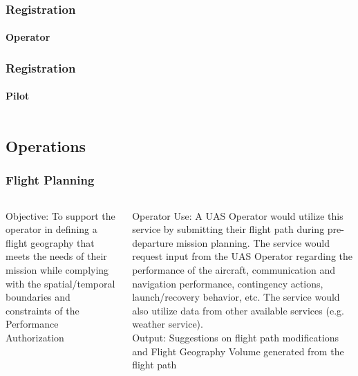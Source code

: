 \documentclass[usenames,dvipsnames,aspectratio=169,serif]{beamer}
\begin{document}
\begin{frame}
   \frametitle{Registration}
   \framesubtitle{Operator}
\end{frame}

\begin{frame}
   \frametitle{Registration}
   \framesubtitle{Pilot}
   \begin{columns}[t]
      \begin{column}{0.5\textwidth}
      \end{column}
      \begin{column}{0.5\textwidth}
      \end{column}
   \end{columns}
\end{frame}



\subsection{Operations}
\begin{frame}
   \frametitle{Flight Planning}
   \begin{columns}[t]
      \begin{column}{0.5\textwidth}
         {Objective: To support the operator in defining a flight geography that meets the needs of their mission while complying with the spatial/temporal boundaries and constraints of the Performance Authorization}
      \end{column}
      \begin{column}{0.5\textwidth}
         Operator Use: A UAS Operator would utilize this service by submitting their flight path during pre-departure mission planning. The service would request input from the UAS Operator regarding the performance of the aircraft, communication and navigation performance, contingency actions, launch/recovery behavior, etc. The service would also utilize data from other available services (e.g. weather service). \\
         Output: Suggestions on flight path modifications and Flight Geography Volume generated from the flight path
      \end{column}
   \end{columns}
\end{frame}
\end{document}
